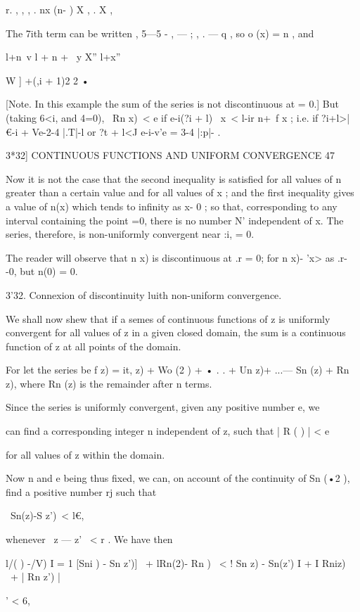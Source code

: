 r. , , , . nx (n- ) X , . X ,

The 7ith term can be written , 5—5 - , — ; , . — q , so o (x) = n ,
and

l+n\ v l + n + \ y X'' l+x''

  W ] +(,i + 1)2 2 •

[Note. In this example the sum of the series is not discontinuous at =
0.] But (taking 6<i, and 4=0), \ Rn x)\ < e if e-i(?i + l) \ x\ < l-ir
n+\ f x ; i.e. if ?i+l>| €-i + Ve-2-4 |.T|-l or ?t + l<J e-i-v'e = 3-4
|:p|- .



3*32] CONTINUOUS FUNCTIONS AND UNIFORM CONVERGENCE 47

Now it is not the case that the second inequality is satisfied for all
values of n greater than a certain value and for all values of x ; and
the first inequality gives a value of n(x) which tends to infinity as
x- 0 ; so that, corresponding to any interval containing the point =0,
there is no number N' independent of x. The series, therefore, is
non-uniformly convergent near :i, = 0.

The reader will observe that n x) is discontinuous at .r = 0; for n
x)- 'x> as .r- -0, but n(0) = 0.

3'32. Connexion of discontinuity luith non-uniform convergence.

We shall now shew that if a semes of continuous functions of z is
uniformly convergent for all values of z in a given closed domain, the
sum is a continuous function of z at all points of the domain.

For let the series be f z) = it, z) + Wo (2 ) + • . . + Un z)+ ...— Sn
(z) + Rn z), where Rn (z) is the remainder after n terms.

Since the series is uniformly convergent, given any positive number e,
we

can find a corresponding integer n independent of z, such that | R ( )
| < e

for all values of z within the domain.

Now n and e being thus fixed, we can, on account of the continuity of
Sn (•2 ), find a positive number rj such that

\ Sn(z)-S z')\ < l€,

whenever \ z — z' \ < r . We have then

l/( ) -/V) I = 1 [Sni ) - Sn z')] \ + lRn(2)- Rn ) \ < ! Sn z) -
Sn(z') I + I Rniz) \ + | Rn z') |

' < 6,

